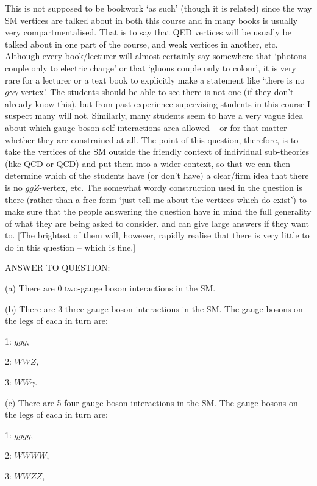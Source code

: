 \documentclass[txfonts]{NSTexam}
\begin{document}
\begin{questions}
{This is not supposed to be bookwork `as such' (though it is related) since the way SM vertices are talked about in both this course and in many books is usually very compartmentalised. That is to say that QED vertices will be usually be talked about in one part of the course, and weak vertices in another, etc.  Although every book/lecturer will almost certainly say somewhere that `photons couple only to electric charge' or that `gluons couple only to colour',  it is very rare for a lecturer or a text book to explicitly make a statement like `there is no $g\gamma\gamma$-vertex'. The students should be able to see there is not one (if they don't already know this), but from past experience supervising students in this course I suspect many will not. Similarly, many students seem to have a very vague idea about which gauge-boson self interactions area allowed -- or for that matter whether they are constrained at all.  The point of this question, therefore, is to take the vertices of the SM outside the friendly context of individual sub-theories (like QCD or QCD) and put them into a wider context, so that we can then determine which of the students have (or don't have) a clear/firm idea that there is no $ggZ$-vertex, etc.   The somewhat wordy construction used in the question is there (rather than a free form `just tell me about the vertices which do exist') to make sure that the people answering the question have in mind the full generality of what they are being asked to consider. and can give large answers if they want to. [The brightest of them will, however, rapidly realise that there is very little to do in this question -- which is fine.]
 
 \vspace{1cm}
 
 ANSWER TO QUESTION:
 
 (a)
 There are 0 two-gauge boson interactions in the SM.

 (b)
 There are 3 three-gauge boson interactions in the SM.  The gauge bosons on the legs of each in turn are:
 
1: $ g g g $, 
 
2:  $ W W Z $, 
 
3: $ W W \gamma $.
 
 (c)
 There are 5 four-gauge boson interactions in the SM.  The gauge bosons on the legs of each in turn are:
 
 1: $ g g g g $, 
   
2:  $ W W W W $, 
 
3:  $ W W Z Z $, 
 
}
\end{questions}
\end{document}
